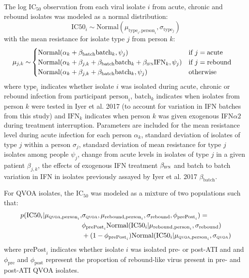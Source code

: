 \documentclass[12pt]{article}
\newcommand{\ifna}{IFN${\alpha 2}$}
\newcommand{\icFifty}{IC$_{50}$}
\begin{document}
  The log \icFifty{} observation from each viral isolate $i$ from acute, chronic and rebound isolates was modeled as a normal distribution:
  \[\text{IC50}_i\sim\text{Normal}(\mu_{\text{type}_i,\text{person}_i},\sigma_\text{type$_j$})\]
  with the mean resistance for isolate type $j$ from person $k$:
  \begin{align*}
    \mu_{j,k}\sim&\begin{cases}
      \text{Normal}(\alpha_{k}+\beta_{\text{batch}}\text{batch}_k,\psi_j) & \text{if } j=\text{acute}\\
      \text{Normal}(\alpha_{k}+\beta_{j,k}+\beta_{\text{batch}}\text{batch}_k+\beta_{\text{\textsc{ifn}}}\text{IFN}_{k},\psi_j) & \text{if } j=\text{rebound}\\
      \text{Normal}(\alpha_{k}+\beta_{j,k}+\beta_{\text{batch}}\text{batch}_k,\psi_j) & \text{otherwise}
    \end{cases}
  \end{align*}
  where $\text{type}_i$ indicates whether isolate $i$ was isolated during acute, chronic or rebound infection from participant $\text{person}_i$, $\text{batch}_k$ indicates when isolates from person $k$ were tested in Iyer et al. 2017 (to account for variation in IFN batches from this study) and $\text{IFN}_k$ indicates when person $k$ was given exogenous \ifna{} during treatment interruption. Parameters are included for the mean resistance level during acute infection for each person $\alpha_k$, standard deviation of isolates of type $j$ within a person $\sigma_j$, standard deviation of mean resistance for type $j$ isolates among people $\psi_j$, change from acute levels in isolates of type $j$ in a given patient $\beta_{j,k}$, the effects of exogenous IFN treatment $\beta_{\textsc{ifn}}$ and batch to batch variation in IFN in isolates previously assayed by Iyer et al. 2017 $\beta_{\text{batch}}$. 


  For QVOA isolates, the \icFifty{} was modeled as a mixture of two populations such that:
  \[
  \begin{split}
    p(\text{IC50}_i|\mu_{\text{\textsc{qvoa}},\text{person}_i},&\sigma_{\text{\textsc{qvoa}}},\mu_{\text{rebound},\text{person}_i},\sigma_{\text{rebound}},\phi_{\text{prePost}_i})=\\
    &\phi_{\text{prePost}_i}\text{Normal}(\text{IC50}_i|\mu_{\text{rebound},\text{person}_i},\sigma_{\text{rebound}})\\
    &+ (1-\phi_{\text{prePost}_i})\text{Normal}(\text{IC50}_i|\mu_{\text{\textsc{qvoa}},\text{person}_i},\sigma_{\text{\textsc{qvoa}}}) 
  \end{split}
  \]
  where $\text{prePost}_i$ indicates whether isolate $i$ was isolated  pre- or post-ATI and and $\phi_\text{pre}$ and $\phi_\text{post}$ represent the proportion of rebound-like virus present in pre- and post-ATI QVOA isolates.
\end{document}
